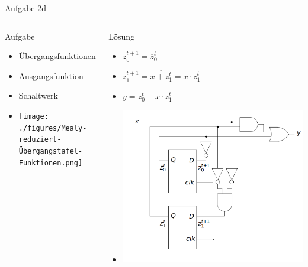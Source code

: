 \documentclass{beamer}
\begin{document}
    \begin{frame}{Aufgabe 2d}{}
      \begin{columns}
        \begin{column}{0.5\textwidth}
            \begin{block}{Aufgabe}
                \begin{itemize}
                    \item Übergangsfunktionen
                    \item Ausgangsfunktion
                    \item Schaltwerk
                    \item \texttt{[image: ./figures/Mealy-reduziert-Übergangstafel-Funktionen.png]}
                \end{itemize}
            \end{block}
        \end{column}
        \begin{column}{0.5\textwidth}
            \begin{block}{Lösung}
                \begin{itemize}
                    \item $z_0^{t+1} = \overline{z}_0^t$
                    \item $z_1^{t+1} = \overline{x + z_1^t} = \overline{x} \cdot \overline{z}_1^t$
                    \item $y = z_0^t + x \cdot z_1^t$
                    \item \includegraphics[scale = 0.2]{./figures/Mealy-reduziert-Schaltwerk.png}
                \end{itemize}
            \end{block}
        \end{column}
      \end{columns}
    \end{frame}
\end{document}
